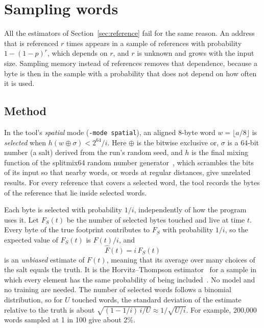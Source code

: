 \documentclass[11pt]{article}
\newcommand{\knob}[1]{\texttt{-#1}}
\newcommand{\secref}[1]{Section~\ref{#1}}
\newcommand{\term}[1]{\emph{#1}}
\begin{document}
\section{Sampling words}
\label{sec:spatial}

All the estimators of \secref{sec:reference} fail for the same reason. An address that is referenced $r$ times appears in a sample of references with probability $1 - (1-p)^r$, which depends on $r$, and $r$ is unknown and grows with the input size. Sampling memory instead of references removes that dependence, because a byte is then in the sample with a probability that does not depend on how often it is used.

\subsection{Method}

In the tool's \term{spatial} mode (\knob{mode spatial}), an aligned 8-byte word $w = \lfloor a/8 \rfloor$ is \term{selected} when $h(w \oplus \sigma) < 2^{64}/i$. Here $\oplus$ is the bitwise exclusive or, $\sigma$ is a 64-bit number (a salt) derived from the run's random seed, and $h$ is the final mixing function of the splitmix64 random number generator~\cite{steele2014splitmix}, which scrambles the bits of its input so that nearby words, or words at regular distances, give unrelated results. For every reference that covers a selected word, the tool records the bytes of the reference that lie inside selected words.

Each byte is selected with probability $1/i$, independently of how the program uses it. Let $F_S(t)$ be the number of selected bytes touched and live at time $t$. Every byte of the true footprint contributes to $F_S$ with probability $1/i$, so the expected value of $F_S(t)$ is $F(t)/i$, and
\begin{equation}
\hat{F}(t) = i\,F_S(t)
\end{equation}
is an \term{unbiased} estimate of $F(t)$, meaning that its average over many choices of the salt equals the truth. It is the Horvitz--Thompson estimator~\cite{horvitz1952} for a sample in which every element has the same probability of being included~\cite{cochran1977}. No model and no training are needed. The number of selected words follows a binomial distribution, so for $U$ touched words, the standard deviation of the estimate relative to the truth is about $\sqrt{(1 - 1/i)\,i/U} \approx 1/\sqrt{U/i}$. For example, 200{,}000 words sampled at 1 in 100 give about 2\%.
\end{document}
